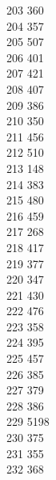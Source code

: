 { 203	360 \\
 204	357 \\
 205	507 \\
 206	401 \\
 207	421 \\
 208	407 \\
 209	386 \\
 210	350 \\
 211	456 \\
 212	510 \\
 213	148 \\
 214	383 \\
 215	480 \\
 216	459 \\
 217	268 \\
 218	417 \\
 219	377 \\
 220	347 \\
 221	430 \\
 222	476 \\
 223	358 \\
 224	395 \\
 225	457 \\
 226	385 \\
 227	379 \\
 228	386 \\
 229	5198 \\
 230	375 \\
 231	355 \\
 232	368 \\
}
